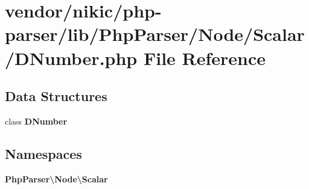 \section{vendor/nikic/php-\/parser/lib/\+Php\+Parser/\+Node/\+Scalar/\+D\+Number.php File Reference}
\label{_d_number_8php}
\subsection*{Data Structures}
\begin{DoxyCompactItemize}
\item 
class {\bf D\+Number}
\end{DoxyCompactItemize}
\subsection*{Namespaces}
\begin{DoxyCompactItemize}
\item 
 {\bf Php\+Parser\textbackslash{}\+Node\textbackslash{}\+Scalar}
\end{DoxyCompactItemize}
